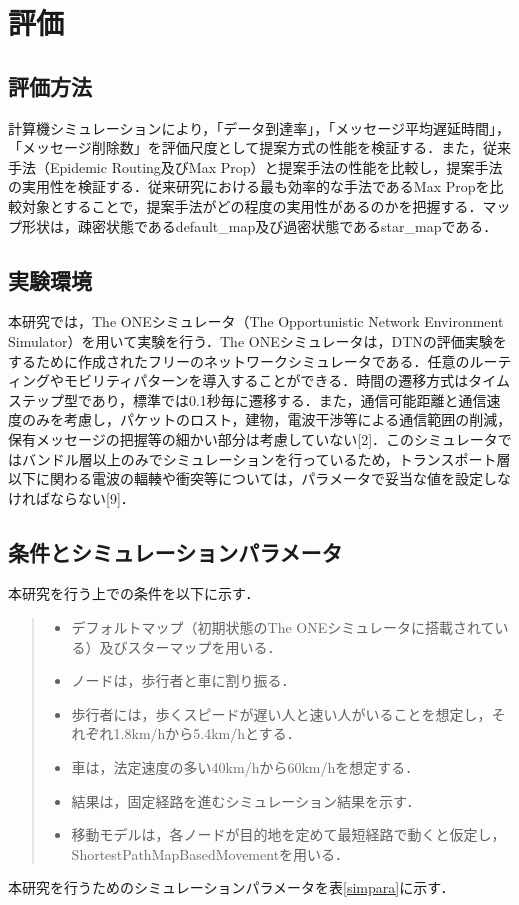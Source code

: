 \documentclass[11pt]{icsthesis}
\begin{document}
\chapter{評価}
\section{評価方法}
計算機シミュレーションにより，「データ到達率」，「メッセージ平均遅延時間」，「メッセージ削除数」を評価尺度として提案方式の性能を検証する．また，従来手法（Epidemic Routing及びMax Prop）と提案手法の性能を比較し，提案手法の実用性を検証する．従来研究における最も効率的な手法であるMax Propを比較対象とすることで，提案手法がどの程度の実用性があるのかを把握する．マップ形状は，疎密状態であるdefault\_map及び過密状態であるstar\_mapである．

\section{実験環境}
本研究では，The ONEシミュレータ（The Opportunistic Network Environment Simulator）を用いて実験を行う．The ONEシミュレータは，DTNの評価実験をするために作成されたフリーのネットワークシミュレータである．任意のルーティングやモビリティパターンを導入することができる．時間の遷移方式はタイムステップ型であり，標準では0.1秒毎に遷移する．また，通信可能距離と通信速度のみを考慮し，パケットのロスト，建物，電波干渉等による通信範囲の削減，保有メッセージの把握等の細かい部分は考慮していない[2]．このシミュレータではバンドル層以上のみでシミュレーションを行っているため，トランスポート層以下に関わる電波の輻輳や衝突等については，パラメータで妥当な値を設定しなければならない[9]．

\section{条件とシミュレーションパラメータ}
本研究を行う上での条件を以下に示す．
\begin{quote}
 \begin{itemize}
  \item デフォルトマップ（初期状態のThe ONEシミュレータに搭載されている）及びスターマップを用いる．
  \item ノードは，歩行者と車に割り振る．
  \item 歩行者には，歩くスピードが遅い人と速い人がいることを想定し，それぞれ1.8km/hから5.4km/hとする．
  \item 車は，法定速度の多い40km/hから60km/hを想定する．
  \item 結果は，固定経路を進むシミュレーション結果を示す．
  \item 移動モデルは，各ノードが目的地を定めて最短経路で動くと仮定し，ShortestPathMapBasedMovementを用いる．
 \end{itemize}
\end{quote}
本研究を行うためのシミュレーションパラメータを表\ref{simpara}に示す．
\end{document}
